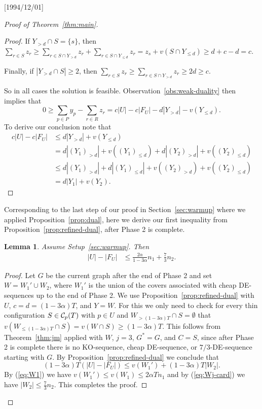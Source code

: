\NeedsTeXFormat{LaTeX2e}[1994/12/01]\documentclass[letterpaper, 11pt]{article}
\newtheorem{lem}[thm]{Lemma}
\theoremstyle{definition}
\theoremstyle{remark}
\numberwithin{equation}{section}
\begin{document}
\begin{proof}[Proof of Theorem~\ref{thm:main}]
\begin{proof}
If $Y_{>d}\cap S = \{ s \}$, then $\sum_{r\in
  S}z_r \geq \sum_{r\in S\cap Y_{>d}}z_r + \sum_{r\in S \cap Y_{\leq d}}z_r
= z_s + v(S\cap Y_{\leq d}) \geq d + c-d = c$. 
  
Finally, if  $|Y_{>d}\cap S| \geq 2$, then $\sum_{r\in
  S}z_r \geq \sum_{r\in S\cap Y_{>d}}z_r \geq 2d \geq c$.

So in all cases the solution is feasible. 
Observation~\ref{obs:weak-duality} then implies that $$0\geq \sum_{p\in P}y_p -\sum_{r\in R}z_r = c|U| -
c|F_U| -d|Y_{>d}| - v(Y_{\leq d}).$$ 
To derive our conclusion note that 
\begin{align*}
  c|U| -c|F_U| & \leq d|Y_{>d}| + v(Y_{\leq d}) \\ & = d|(Y_1)_{>d}| +
  v((Y_1)_{\leq d})  +  d|(Y_2)_{>d}| + v((Y_2)_{\leq d}) \\
  & \leq d|(Y_1)_{>d}| +
  d|(Y_1)_{\leq d}|  +  v((Y_2)_{>d}) + v((Y_2)_{\leq d}) \\
  & = d|Y_1| + v(Y_2).
\end{align*}
\end{proof}


Corresponding to the last step of our proof in
Section~\ref{sec:warmup} where we applied Proposition~\ref{prop:dual},
here we derive our first inequality  
from Proposition~\ref{prop:refined-dual}, after Phase 2 is complete.


\begin{lem}\label{lem:phase2} Assume Setup~\ref{sec:warmup}. Then 
  \begin{align} \label{eq:phase2}
    |U|-|F_U| & \leq \frac{2\alpha}{1-3\alpha}n_1+\frac73n_2.
    \end{align}
\end{lem}
\begin{proof}
  Let $G$ be the current graph after the end of Phase 2 and set
  $W=W_1'\cup W_2$, where $W_1'$ is the union of the covers
associated with cheap DE-sequences up to the end of Phase 2.
We use Proposition~\ref{prop:refined-dual} with $U$, $c=d=(1-3\alpha) T$, and
$Y=W$. For this we only need to check for every thin configuration $S \in {\cal
  C}_p(T)$ with $p\in U$ and
$W_{>(1-3\alpha) T}\cap S =\emptyset$ that $v(W_{\leq (1-3\alpha) T} \cap S) = v(W\cap S) \geq
(1-3\alpha) T$. This follows from Theorem~\ref{thm:jm} applied with $W$, $j=3$,
$G^*=G$, and $C=S$, since after Phase 2 is
complete there is no KO-sequence, cheap DE-sequence, or $7/3$-DE-sequence
starting with $G$.
By Proposition~\ref{prop:refined-dual} we conclude that
$$(1-3\alpha) T(|U|- |F_U|) \leq v(W_1') + (1-3\alpha) T|W_2|.$$
By (\ref{eq:W1}) we have $v(W_1') \leq v(W_1)\leq 2\alpha Tn_1$ and by
(\ref{eq:Wj-card}) we have $|W_2| \leq \frac{7}{3}n_2$.
This completes the proof.
\end{proof}


\end{proof}
\end{document}
